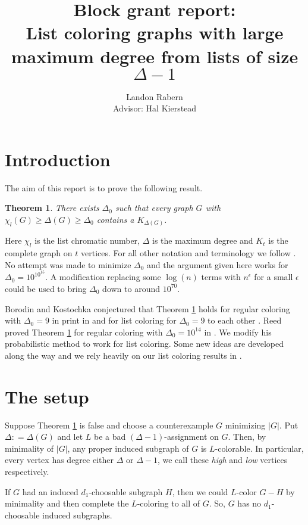 \documentclass[12pt]{article}
\title{Block grant report: \\
List coloring graphs with large maximum degree from lists of size $\Delta-1$}
\author{Landon Rabern\\Advisor: Hal Kierstead}
\theoremstyle{plain}
\newtheorem{thm}{Theorem}
\theoremstyle{definition}
\theoremstyle{remark}
\newcommand{\card}[1]{\left|#1\right|}
\newcommand{\DefinedAs}{\mathrel{\mathop:}=}
\begin{document}
\maketitle

\section{Introduction}
\noindent The aim of this report is to prove the following result.

\begin{thm}\label{mainthm}
There exists $\Delta_0$ such that every graph $G$ with $\chi_l(G) \geq \Delta(G)
\geq \Delta_0$ contains a $K_{\Delta(G)}$.
\end{thm}

Here $\chi_l$ is the list chromatic number, $\Delta$ is the maximum degree and $K_t$ is the complete graph on $t$ vertices.  For all other notation and terminology we follow \cite{mules}. No attempt was made to minimize $\Delta_0$ and the argument given here works for $\Delta_0 = 10^{10^{15}}$.  A  modification replacing some $\log(n)$ terms with $n^{\epsilon}$ for a small $\epsilon$ could be used to bring $\Delta_0$ down to around $10^{70}$.  

Borodin and Kostochka conjectured that Theorem \ref{mainthm} holds for regular coloring with $\Delta_0 = 9$ in print in \cite{borodin1977upper} and for list coloring for $\Delta_0=9$ to each other \cite{PersonalComms}.  Reed proved Theorem \ref{mainthm} for regular coloring with $\Delta_0 = 10^{14}$ in \cite{reed1999strengthening}.  We modify his probabilistic method to work for list coloring.  Some new ideas are developed along the way and we rely heavily on our list coloring results in \cite{mules}.

\section{The setup}

Suppose Theorem \ref{mainthm} is false and choose a counterexample $G$ minimizing
$\card{G}$.  Put $\Delta \DefinedAs \Delta(G)$ and let $L$ be a bad
$(\Delta - 1)$-assignment on $G$.  Then, by minimality of $\card{G}$, any proper
induced subgraph of $G$ is $L$-colorable.  In particular, every vertex has
degree either $\Delta$ or $\Delta-1$, we call these \emph{high} and \emph{low}
vertices respectively. 

If $G$ had an induced $d_1$-choosable subgraph $H$, then we could
$L$-color $G - H$ by minimality and then complete the $L$-coloring to all of
$G$.  So, $G$ has no $d_1$-choosable induced subgraphs.  
\end{document}
